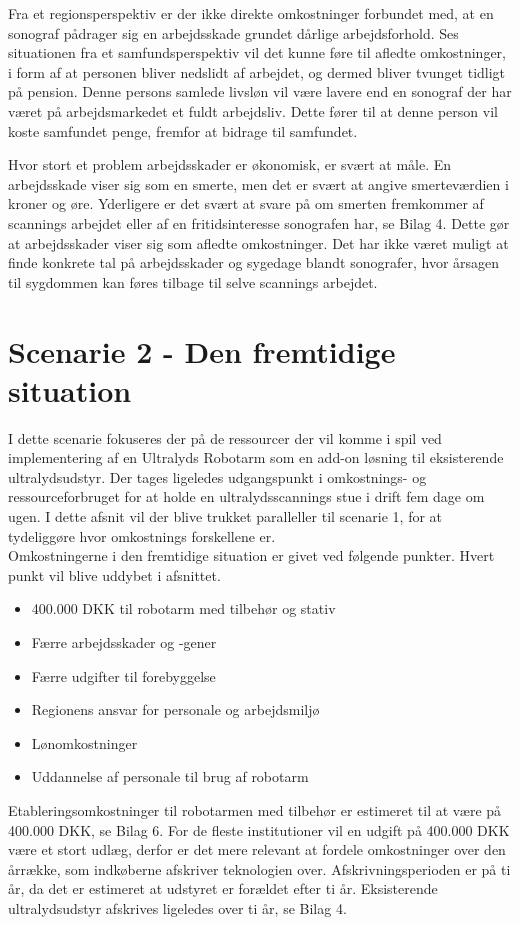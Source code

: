 Fra et regionsperspektiv er der ikke direkte omkostninger forbundet med, at en sonograf pådrager sig en arbejdsskade grundet dårlige arbejdsforhold. Ses situationen fra et samfundsperspektiv vil det kunne føre til afledte omkostninger, i form af at personen bliver nedslidt af arbejdet, og dermed bliver tvunget tidligt på pension. Denne persons samlede livsløn vil være lavere end en sonograf der har været på arbejdsmarkedet et fuldt arbejdsliv. Dette fører til at denne person vil koste samfundet penge, fremfor at bidrage til samfundet. 

Hvor stort et problem arbejdsskader er økonomisk, er svært at måle. En arbejdsskade viser sig som en smerte, men det er svært at angive smerteværdien i kroner og øre. Yderligere er det svært
at svare på om smerten fremkommer af scannings arbejdet eller af en fritidsinteresse sonografen har, se Bilag 4. Dette gør at arbejdsskader viser sig som afledte omkostninger. Det har ikke været muligt at finde konkrete tal på arbejdsskader og sygedage blandt sonografer, hvor årsagen til sygdommen kan føres tilbage til selve scannings arbejdet.  


\section{Scenarie 2 - Den fremtidige situation} \label{fremtidige}
I dette scenarie fokuseres der på de ressourcer der vil komme i spil ved implementering af en Ultralyds Robotarm som en add-on løsning til eksisterende ultralydsudstyr. Der tages ligeledes udgangspunkt i omkostnings- og ressourceforbruget for at holde en ultralydsscannings stue i drift fem dage om ugen. I dette afsnit vil der blive trukket paralleller til scenarie 1, for at tydeliggøre hvor omkostnings forskellene er. \\
Omkostningerne i den fremtidige situation er givet ved følgende punkter. Hvert punkt vil blive uddybet i afsnittet.
\begin{itemize}
\item 400.000 DKK til robotarm med tilbehør og stativ
\item Færre arbejdsskader og -gener
\item Færre udgifter til forebyggelse
\item Regionens ansvar for personale og arbejdsmiljø
\item Lønomkostninger
\item Uddannelse af personale til brug af robotarm
\end{itemize}
Etableringsomkostninger til robotarmen med tilbehør er estimeret til at være på 400.000 DKK, se Bilag 6.
For de fleste institutioner vil en udgift på 400.000 DKK være et stort udlæg, derfor er det mere relevant at fordele omkostninger over den årrække, som indkøberne afskriver teknologien over. Afskrivningsperioden er på ti år, da det er estimeret at udstyret er forældet efter ti år. Eksisterende ultralydsudstyr afskrives ligeledes over ti år, se Bilag 4.

